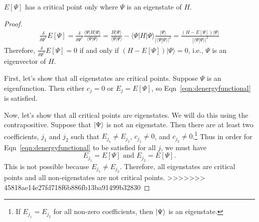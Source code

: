 \begin{theorem}
\label{theorem:criticalpoint}
$E[\Psi]$ has a critical point only where $\Psi$ is an eigenstate of $H$.
\end{theorem}
\begin{proof}
\begin{eqnarray}
\frac{\delta }{\delta \Psi^*}  E[\Psi] = \frac{\delta}{\delta \Psi^*}\frac{\langle \Psi |H|\Psi\rangle}{\langle \Psi |\Psi\rangle} = \frac{H|\Psi\rangle}{\langle \Psi |\Psi\rangle} - \langle \Psi |H|\Psi\rangle \frac{|\Psi \rangle}{|\langle \Psi | \Psi\rangle|^2} =\frac{ (H-E[\Psi])|\Psi\rangle }{|\langle\Psi|\Psi\rangle|^2}
\end{eqnarray}
Therefore, 
$\frac{\delta }{\delta \Psi^*}  E[\Psi] = 0$ if and only if $(H-E[\Psi])|\Psi\rangle =0$, i.e., $\Psi$ is an eigenvector of $H$. 


First, let's show that all eigenstates are critical points. 
Suppose $\Psi$ is an eigenfunction. 
Then either $c_j=0$ or $E_j = E[\Psi]$, so Eqn~\ref{eqn:denergyfunctional} is satisfied.  


Now, let's show that all critical points are eigenstates. 
We will do this using the contrapositive.
Suppose that $\ket{\Psi}$ is not an eigenstate. 
Then there are at least two coefficients, $j_1$ and $j_2$ such that $E_{j_1} \neq E_{j_2}$, $c_{j_1}\neq 0$, and $c_{j_2}\neq 0$.\footnote{If  $E_{j_1} = E_{j_2}$ for all non-zero coefficients, then $\ket{\Psi}$ is an eigenstate.}
Thus in order for Eqn~\ref{eqn:denergyfunctional} to be satisfied for all $j$, we must have 
\begin{equation}
E_{j_1} = E[\Psi] \text{ and } E_{j_2} = E[\Psi].
\end{equation}
This is not possible because $E_{j_1} \neq E_{j_2}$. 
Therefore, all eigenstates are critical points and all non-eigenstates are not critical points.
>>>>>>> 45818ae14e27fd718f6b886fb13ba91499b32830
\end{proof}


